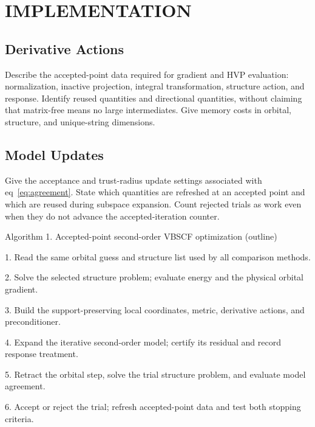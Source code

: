 \documentclass[12pt]{article}
\begin{document}

\section{IMPLEMENTATION}

\subsection{Derivative Actions}

Describe the accepted-point data required for gradient and HVP evaluation: normalization, inactive projection, integral transformation, structure action, and response. Identify reused quantities and directional quantities, without claiming that matrix-free means no large intermediates. Give memory costs in orbital, structure, and unique-string dimensions.


\subsection{Model Updates}

Give the acceptance and trust-radius update settings associated with eq~\eqref{eq:agreement}. State which quantities are refreshed at an accepted point and which are reused during subspace expansion. Count rejected trials as work even when they do not advance the accepted-iteration counter.


Algorithm 1. Accepted-point second-order VBSCF optimization (outline)


1. Read the same orbital guess and structure list used by all comparison methods.


2. Solve the selected structure problem; evaluate energy and the physical orbital gradient.


3. Build the support-preserving local coordinates, metric, derivative actions, and preconditioner.


4. Expand the iterative second-order model; certify its residual and record response treatment.


5. Retract the orbital step, solve the trial structure problem, and evaluate model agreement.


6. Accept or reject the trial; refresh accepted-point data and test both stopping criteria.
\end{document}
